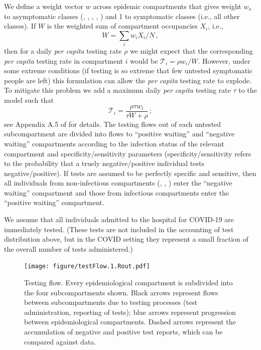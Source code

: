 \documentclass[12pt]{article}\usepackage[]{graphicx}\usepackage[]{color}
\begin{document}
We define a weight vector $w$ across epidemic compartments that gives weight $w_\textrm{a}$ to asymptomatic classes (, , , , ) and 1 to symptomatic classes (i.e., all other classes).
If $W$ is the weighted sum of compartment occupancies $X_i$, i.e., 
\begin{equation}
W = \sum_i w_i X_i/N \,,
\end{equation}
then for a daily \emph{per capita} testing rate $\rho$ we might expect that the corresponding \emph{per capita} testing rate in compartment $i$ would be ${\mathcal T}_i = \rho w_i/W$. 
However, under some extreme conditions (if testing is so extreme that few untested symptomatic people are left) this formulation can allow the \emph{per capita} testing rate to explode. To mitigate this problem we add a maximum daily \emph{per capita} testing rate $\tau$ to the model such that
\begin{equation}
{\mathcal T}_i = \frac{\rho \tau w_i}{\tau W + \rho} \,;
\end{equation}
see Appendix A.5 of \cite{Ghar+22} for details.  The testing flows out of each untested subcompartment are divided into flows to ``positive waiting'' and ``negative waiting'' compartments according to the infection status of the relevant compartment and specificity/sensitivity parameters (specificity/sensitivity refers to the probability that a truely negative/positive individual tests negative/positive).   If tests are assumed to be perfectly specific and sensitive, then all individuals from non-infectious compartments (, , ) enter the ``negative waiting'' compartment and those from infectious compartments enter the ``positive waiting'' compartment.

We assume that all individuals admitted to the hospital for COVID-19 are immediately tested. (These tests are not included in the accounting of test distribution above, but in the COVID setting they represent a small fraction of the overall number of tests administered.)

\begin{figure}
  \texttt{[image: figure/testFlow.1.Rout.pdf]}
  \caption{Testing flow. Every epidemiological compartment is subdivided into the four subcompartments shown.
    Black arrows represent flows between subcompartments due to testing processes (test administration, reporting of tests); blue arrows represent progression between epidemiological compartments.
    Dashed arrows represent the accumulation of negative and positive test reports, which can be compared against data.}
  \label{fig:testing_flow}
\end{figure}
\end{document}
